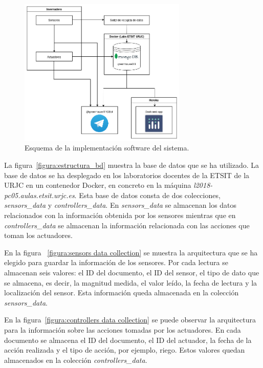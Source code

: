 \documentclass[a4paper, 12pt, oneside]{book}
\begin{document}
\begin{figure}[H]
	\centering
    \includegraphics[width=8cm, keepaspectratio]{img/esquema_general_software}
    \caption{Esquema de la implementación software del sistema.}
    \label{figura:esquema_general_software}
\end{figure}

La figura~\ref{figura:estructura_bd} muestra la base de datos que se ha utilizado. La base de datos se ha desplegado en los laboratorios docentes de la ETSIT de la URJC en un contenedor Docker, en concreto en la máquina \textit{l2018-pc05.aulas.etsit.urjc.es}. Esta base de datos consta de dos colecciones, \textit{sensors\_data} y \textit{controllers\_data}. En \textit{sensors\_data} se almacenan los datos relacionados con la información obtenida por los sensores mientras que en \textit{controllers\_data} se almacenan la información relacionada con las acciones que toman los actuadores.

En la figura ~\ref{figura:sensors data collection} se muestra la arquitectura que se ha elegido para guardar la información de los sensores. Por cada lectura se almacenan seis valores: el ID del documento, el ID del sensor, el tipo de dato que se almacena, es decir, la magnitud medida, el valor leído, la fecha de lectura y la localización del sensor. Esta información queda almacenada en la colección \textit{sensors\_data}.

En la figura~\ref{figura:controllers data collection} se puede observar la arquitectura para la información sobre las acciones tomadas por los actuadores. En cada documento se almacena el ID del documento, el ID del actuador, la fecha de la acción realizada y el tipo de acción, por ejemplo, riego. Estos valores quedan almacenados en la colección \textit{controllers\_data}.
\end{document}
